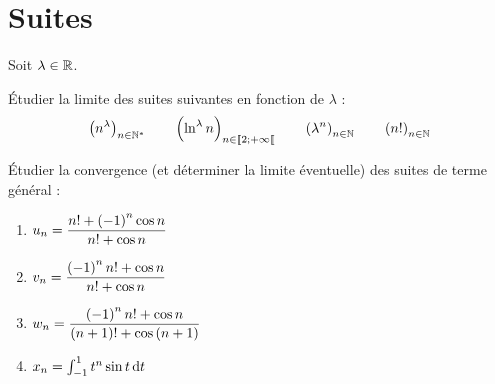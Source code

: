 \chapter{Suites}

\begin{exo}
Soit \(\lambda\in\mathbb{R}\).

Étudier la limite des suites suivantes en fonction de \(\lambda\) : \[\left(n^\lambda\right)_{n\in\mathbb{N}^*}\qquad\left(\ln^\lambda n\right)_{n\in\left\llbracket2;+\infty\right\llbracket}\qquad\left(\lambda^n\right)_{n\in\mathbb{N}}\qquad\left(n!\right)_{n\in\mathbb{N}}\]
\end{exo}

\begin{corr}
\end{corr}

\begin{exo}
Étudier la convergence (et déterminer la limite éventuelle) des suites de terme général :

\begin{enumerate}
\item \(u_n=\dfrac{n!+\left(-1\right)^n\cos n}{n!+\cos n}\) \\

\item \(v_n=\dfrac{\left(-1\right)^nn!+\cos n}{n!+\cos n}\) \\

\item \(w_n=\dfrac{\left(-1\right)^nn!+\cos n}{\left(n+1\right)!+\cos\left(n+1\right)}\) \\

\item \(x_n=\int_{-1}^1t^n\sin t\odif{t}\)
\end{enumerate}
\end{exo}

\begin{corr}
\end{corr}

